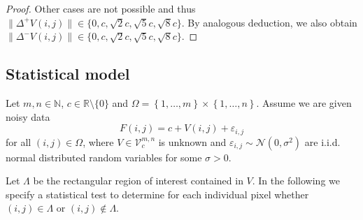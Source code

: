 \documentclass[a4paper,12pt]{article}
\newcommand{\norm}[1]{\lVert#1\rVert}
\theoremstyle{plain}
\theoremstyle{definition}
\begin{document}
\begin{proof}
	Other cases are not possible and thus $\norm{\Delta^+ V(i, j)} \in \{ 0, c, \sqrt{2} c, \sqrt{5} c, \sqrt{8} c \}$. By analogous deduction, we also obtain $\norm{\Delta^- V(i, j)} \in \{ 0, c, \sqrt{2} c, \sqrt{5} c, \sqrt{8} c \}$.
\end{proof}



\subsection{Statistical model}\label{section: statisticalmodel}

Let $m, n \in \mathbb{N}$, $c \in \mathbb{R} \setminus \{ 0 \}$ and $\Omega = \left\{ 1, \dots, m \right\} \times \left\{ 1, \dots, n \right\}$. Assume we are given noisy data
\begin{equation}\label{statmodel2}
	F(i, j) = c + V(i, j) + \varepsilon_{i, j}
\end{equation}
for all $(i, j) \in \Omega$, where $V \in \mathcal{V}_c^{m, n}$ is unknown and $\varepsilon_{i, j} \sim \mathcal{N}(0, \sigma^2)$ are i.i.d. normal distributed random variables for some $\sigma > 0$.

Let $\varLambda$ be the rectangular region of interest contained in $V$. In the following we specify a statistical test to determine for each individual pixel whether $(i, j) \in \varLambda$ or $(i, j) \notin \varLambda$.
\end{document}
